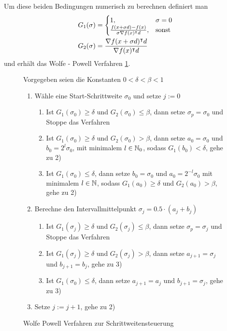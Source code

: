 Um diese beiden Bedingungen numerisch zu berechnen definiert man
\begin{equation}
\begin{aligned}
 G_1(\sigma)&=
 \begin{cases}
 1,& \sigma=0\\
 \frac{f(x+\sigma d)-f(x)}{\sigma \nabla f(x)^\intercal d}, & \text{sonst}
 \end{cases} \\
 G_2(\sigma) &= \frac{\nabla f(x+\sigma d)^\intercal d}{\nabla f(x)^\intercal d}
 \end{aligned}
\end{equation}
und erhält das Wolfe - Powell Verfahren \ref{alg:wolfePowell}.

\begin{figure}
\begin{framed}
Vorgegeben seien die Konstanten $0<\delta<\beta<1$
 \begin{enumerate}
  \item Wähle eine Start-Schrittweite $\sigma_0$ und setze $j:=0$
  \begin{enumerate}
   \item Ist $G_1(\sigma_0)\geq \delta$ und $G_2(\sigma_0)\leq \beta$, dann setze $\sigma_p=\sigma_0$ und Stoppe das Verfahren
   \item Ist $G_1(\sigma_0)\geq \delta$ und $G_2(\sigma_0)> \beta$, dann setze $a_0=\sigma_0$ und $b_0=2^l\sigma_0$, mit minimalem $l\in \mathbb{N}_0$, sodass $G_1(b_0)<\delta$, gehe zu 2)
   \item Ist $G_1(\sigma_0)\leq \delta$, dann setze $b_0=\sigma_0$ und $a_0=2^{-l}\sigma_0$ mit minimalem $l\in \mathbb{N}$, sodass $G_1(a_0)\geq\delta$ und $G_2(a_0)>\beta$, gehe zu 2)
  \end{enumerate}
  \item Berechne den Intervallmittelpunkt $\sigma_j = 0.5\cdot (a_j+b_j)$
  \begin{enumerate}
    \item Ist $G_1(\sigma_j)\geq \delta$ und $G_2(\sigma_j)\leq \beta$, dann setze $\sigma_p=\sigma_j$ und Stoppe das Verfahren
    \item Ist $G_1(\sigma_j)\geq \delta$ und $G_2(\sigma_j)> \beta$, dann setze $a_{j+1}=\sigma_j$ und $b_{j+1}=b_j$, gehe zu 3)
    \item Ist $G_1(\sigma_0)\leq \delta$, dann setze $a_{j+1}=a_j$ und $b_{j+1}=\sigma_j$, gehe zu 3)
  \end{enumerate}
  \item Setze $j:=j+1$, gehe zu 2)
 \end{enumerate}
\end{framed}
\caption{Wolfe Powell Verfahren zur Schrittweitensteuerung}
\label{alg:wolfePowell}
\end{figure}

